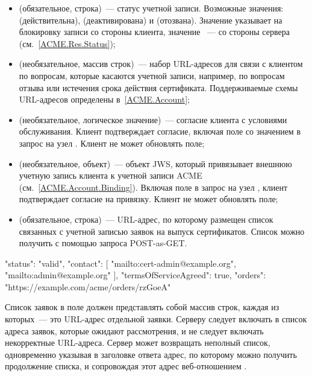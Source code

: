 \begin{itemize}
\item
{} (обязательное, строка)~--- статус учетной записи. 
Возможные значения:  (действительна),  
(деактивирована) и  (отозвана).
%
Значение  указывает на блокировку записи со стороны 
клиента, значение ~--- со стороны сервера 
(см.~\ref{ACME.Res.Status});

\item
{} (необязательное, массив строк)~--- набор URL-адресов для связи с 
клиентом по вопросам, которые касаются учетной записи, например, по вопросам 
отзыва или истечения срока действия сертификата. Поддерживаемые 
схемы URL-адресов определены в~\ref{ACME.Account};

\item
{} (необязательное, логическое значение)~--- 
согласие клиента с условиями обслуживания. Клиент подтверждает согласие, 
включая поле со значением  в запрос на узел .
Клиент не может обновлять поле;

\item
{} (необязательное, объект)~--- 
объект JWS, который привязывает внешнюю учетную запись клиента к учетной записи 
ACME (см.~\ref{ACME.Account.Binding}). Включая поле в запрос на узел 
, клиент подтверждает согласие на привязку. 
Клиент не может обновлять поле;

\item
{} (обязательное, строка)~--- URL-адрес, по которому размещен список 
связанных с учетной записью заявок на выпуск сертификатов. Список можно 
получить с помощью запроса POST-as-GET. 
\end{itemize}

\begin{codeblock}
{
  "status": "valid",
  "contact": [
    "mailto:cert-admin@example.org",
    "mailto:admin@example.org"
  ],
  "termsOfServiceAgreed": true,
  "orders": "https://example.com/acme/orders/rzGoeA"
}
\end{codeblock}
\fi

Список заявок в поле  должен представлять собой массив строк,
каждая из которых~--- это URL-адрес отдельной заявки.
%
Серверу следует включать в список адреса заявок, которые ожидают  рассмотрения,
и не следует включать некорректные URL-адреса.
%
Сервер может возвращать неполный список, одновременно указывая в заголовке
 ответа адрес, по которому можно получить продолжение списка, и
сопровождая этот адрес веб-отношением .

